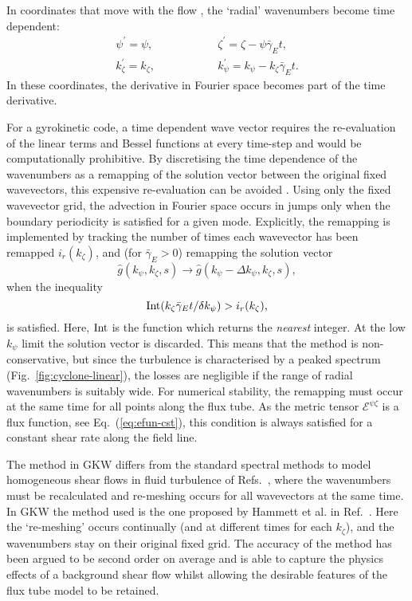 In coordinates that move with the flow  \cite{Rogallo81,Zang88,Pumir96}, the `radial' wavenumbers become time dependent:
\begin{align}
\psi^\prime = \psi , &\qquad& \qquad \zeta^\prime=\zeta-\psi \bar \gamma_E t ,\\
k_\zeta^\prime = k_\zeta , &\qquad& \qquad  k_\psi^\prime = k_\psi - k_\zeta \bar \gamma_E t .
\end{align}
In these coordinates, the derivative in Fourier space becomes part of the time derivative.

For a gyrokinetic code, a time dependent wave vector requires the re-evaluation of the linear terms and Bessel functions at every time-step
and would be computationally prohibitive. 
By discretising the time dependence of the wavenumbers as a remapping of the solution vector between the original fixed wavevectors, 
this expensive re-evaluation can be avoided \cite{HammettAPS06}. 
Using only the fixed wavevector grid, the advection in Fourier space occurs in jumps only when the boundary periodicity is satisfied for a 
given mode. 
Explicitly, the remapping is implemented by tracking the number of times each wavevector has been remapped $i_r(k_\zeta)$, 
and (for $\bar{\gamma}_E > 0$) remapping the solution vector
\begin{equation}
\hat g (k_\psi, k_\zeta,s) \rightarrow \hat g (k_\psi-\Delta k_\psi, k_\zeta,s),
\end{equation}
 when the inequality
\begin{equation}
 {\rm Int}( k_\zeta \bar{\gamma}_E t / \delta k_\psi ) > i_r (k_\zeta),
\end{equation} 
is satisfied.  Here, ${\rm Int}$ is the function which returns the \textit{nearest} integer.
At the low $k_\psi$ limit the solution vector is discarded.  
This means that the method is non-conservative, but since the turbulence is characterised by a peaked spectrum 
(Fig.~\ref{fig:cyclone-linear}), the losses are negligible if the range of radial wavenumbers is suitably wide.  
For numerical stability, the remapping must occur at the same time for all points along the flux tube. 
As the metric tensor ${\mathcal E}^{\psi \zeta}$ is a flux function, see Eq.~(\ref{eq:efun-cst}), this condition is always satisfied for a 
constant shear rate along the field line.

The method in GKW differs from the standard spectral methods to model homogeneous shear flows in fluid turbulence of
Refs.~\cite{Rogallo81,Zang88,Pumir96}, where the wavenumbers must be recalculated and re-meshing occurs for all wavevectors 
at the same time. 
In GKW the method used is the one proposed by Hammett et al. in Ref.~\cite{HammettAPS06}.  
Here the `re-meshing' occurs continually (and at different times for each $k_\zeta$), and the wavenumbers stay on their original fixed grid.  
The accuracy of the method has been argued to be second order on average \cite{HammettAPS06} and
is able to capture the physics effects of a 
background shear flow whilst allowing the desirable features of the flux tube model to be retained.
 
